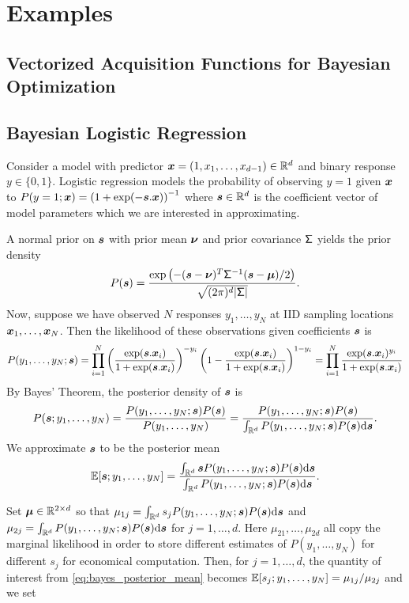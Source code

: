 \documentclass{article}[12pt]
\begin{document}
\section{Examples}

\subsection{Vectorized Acquisition Functions for Bayesian Optimization}

\subsection{Bayesian Logistic Regression}

Consider a model with predictor $\boldsymbol{x} = (1,x_1, \dots, x_{d-1}) \in \mathbb{R}^d$ and binary response $y \in \{0,1\}$. Logistic regression models the probability of observing $y = 1$ given $\boldsymbol{x}$ to $P(y=1;\boldsymbol{x}) = \left(1+\exp(-\boldsymbol{s}.\boldsymbol{x})\right)^{-1}$ where $\boldsymbol{s} \in \mathbb{R}^d$ is the coefficient vector of model parameters which we are interested in approximating.

A normal prior on $\boldsymbol{s}$ with prior mean $\boldsymbol{\nu}$ and prior covariance $\mathsf{\Sigma}$ yields the prior density
$$P(\boldsymbol{s}) = \frac{\exp\left(-(\boldsymbol{s}-\boldsymbol{\nu})^T\mathsf{\Sigma}^{-1}(\boldsymbol{s}-\boldsymbol{\mu})/2\right)}{\sqrt{(2\pi)^d\lvert \mathsf{\Sigma}\rvert}}.$$ Now, suppose we have observed $N$ responses $y_1,\dots,y_N$ at IID sampling locations $\boldsymbol{x}_1,\dots,\boldsymbol{x}_N$. Then the likelihood of these observations given coefficients $\boldsymbol{s}$ is
\begin{equation*}
    P(y_1,\dots,y_N ; \boldsymbol{s}) = \prod_{i=1}^N \left(\frac{\exp(\boldsymbol{s}.\boldsymbol{x}_i)}{1+\exp(\boldsymbol{s}.\boldsymbol{x}_i)}\right)^{-y_i} \left(1-\frac{\exp(\boldsymbol{s}.\boldsymbol{x}_i)}{1+\exp(\boldsymbol{s}.\boldsymbol{x}_i)}\right)^{1-y_i} = \prod_{i=1}^N \frac{\exp(\boldsymbol{s}.\boldsymbol{x}_i)^{y_i}}{1+\exp(\boldsymbol{s}.\boldsymbol{x}_i)}
\end{equation*}
By Bayes' Theorem, the posterior density of $\boldsymbol{s}$ is 
$$P(\boldsymbol{s};y_1,\dots,y_N) = \frac{P(y_1,\dots,y_N;\boldsymbol{s})P(\boldsymbol{s})}{P(y_1,\dots,y_N)} = \frac{P(y_1,\dots,y_N;\boldsymbol{s})P(\boldsymbol{s})}{\int_{\mathbb{R}^d} P(y_1,\dots,y_N;\boldsymbol{s})P(\boldsymbol{s})\mathrm{d}\boldsymbol{s}}.$$
We approximate $\boldsymbol{s}$ to be the posterior mean
\begin{equation}
    \mathbb{E}[\boldsymbol{s};y_1,\dots,y_N] = \frac{\int_{\mathbb{R}^d}\boldsymbol{s} P(y_1,\dots,y_N;\boldsymbol{s})P(\boldsymbol{s})\mathrm{d}\boldsymbol{s}}{\int_{\mathbb{R}^d}P(y_1,\dots,y_N;\boldsymbol{s})P(\boldsymbol{s})\mathrm{d}\boldsymbol{s}}. \label{eq:bayes_posterior_mean}
\end{equation}

Set $\boldsymbol{\mu} \in \mathbb{R}^{2 \times d}$ so that $\mu_{1j} = \int_{\mathbb{R}^d}s_j P(y_1,\dots,y_N;\boldsymbol{s})P(\boldsymbol{s})\mathrm{d}\boldsymbol{s}$ and $\mu_{2j} = \int_{\mathbb{R}^d}P(y_1,\dots,y_N;\boldsymbol{s})P(\boldsymbol{s})\mathrm{d}\boldsymbol{s}$ for $j=1,\dots,d$. Here $\mu_{21},\dots,\mu_{2d}$ all copy the marginal likelihood in order to store different estimates of $P(y_1,\dots,y_N)$ for different $s_j$ for economical computation.  Then, for $j=1,\dots,d$,  the quantity of interest from \eqref{eq:bayes_posterior_mean} becomes $\mathbb{E}[s_j;y_1,\dots,y_N] = \mu_{1j}/\mu_{2j}$ and we set
\end{document}
